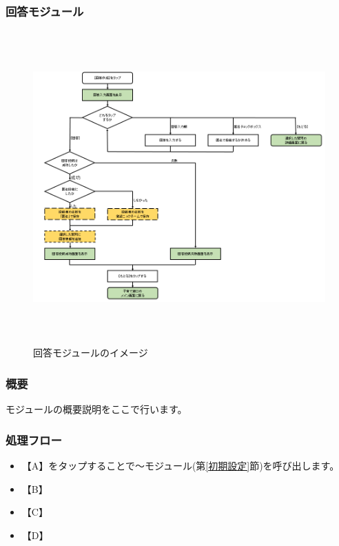 \documentclass[a4j]{jarticle}
\begin{document}
\subsubsection{回答モジュール\label{回答}} %
\begin{figure}[H]
    \begin{center}
      \includegraphics[height = 12.0cm] {子育て窓口_回答.PNG} %
    \caption {回答モジュールのイメージ}
    \label{functionselection}
    \end{center}
\end{figure}
\subsubsection*{概要}
モジュールの概要説明をここで行います。
\subsubsection*{処理フロー}
\begin{itemize}
\item 【A】をタップすることで～モジュール(第\ref{初期設定}節)を呼び出します。%
\item 【B】
\item 【C】
\item 【D】
\end{itemize}
\end{document}
